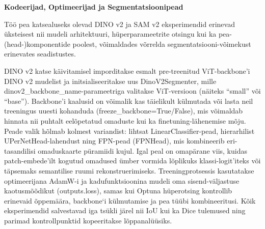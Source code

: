 \textbf{Kodeerijad, Optimeerijad ja Segmentatsioonipead}

Töö pea katsealuseks olevad DINO v2 ja SAM v2 eksperimendid erinevad üksteisest nii mudeli
arhitektuuri, hüperparameetrite otsingu kui ka pea-(head-)komponentide poolest,
võimaldades võrrelda segmentatsiooni-võimekust erinevates seadistustes.

DINO v2 katse käivitamisel imporditakse esmalt pre-treenitud ViT-backbone'i
DINO v2 mudelist ja initsialiseeritakse uus DinoV2Segmenter, mille
dinov2\_backbone\_name-parameetriga valitakse ViT-versioon (näiteks ``small''
või ``base''). Backbone'i kaalusid on võimalik kas täielikult külmutada või
lasta neil treeningus uuesti kohanduda (freeze\_backbone=True/False), mis
võimaldab hinnata nii puhtalt eelõpetatud omaduste kui ka finetuning-lähenemise
mõju. Peade valik hõlmab kolmest variandist: lihtsat LinearClassifier-pead,
hierarhilist UPerNetHead-lahendust ning FPN-pead (FPNHead), mis kombineerib
eri-tasandilisi omaduskaarte püramiidi kujul. Igal peal on omapärane viis,
kuidas patch-embede'ilt kogutud omadused ümber vormida lõplikuks
klassi-logit'iteks või täpsemaks semantilise ruumi rekonstruerimiseks.
Treeningprotsessis kasutatakse optimeerijana AdamW-i ja kadufunktsioonina mudeli
oma sisend-väljastuse kaotusmõõdikut (outputs.loss), samas kui Optuna
hüperotsing kontrollib erinevaid õppemäära, backbone`i külmutamise ja pea tüübi
kombineeritusi. Kõik eksperimendid salvestavad iga tsükli järel nii IoU kui ka
Dice tulemused ning parimad kontrollpunktid kopeeritakse lõppanalüüsiks.


